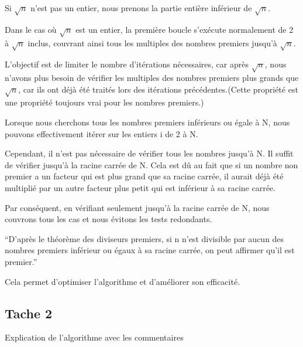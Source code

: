 \documentclass[
    ]{article}
\begin{document}
Si \(\sqrt{n}\) n'est pas un entier, nous prenons la partie entière
inférieur de \(\sqrt{n}\).

Dans le cas où \(\sqrt{n}\) est un entier, la première boucle s'exécute
normalement de 2 à \(\sqrt{n}\) inclus, couvrant ainsi tous les
multiples des nombres premiers jusqu'à \(\sqrt{n}\).

L'objectif est de limiter le nombre d'itérations nécessaires, car après
\(\sqrt{n}\), nous n'avons plus besoin de vérifier les multiples des
nombres premiers plus grands que \(\sqrt{n}\), car ils ont déjà été
traités lors des itérations précédentes.(Cette propriété est une
propriété toujours vrai pour les nombres premiers.)

Lorsque nous cherchons tous les nombres premiers inférieurs ou égale à
N, nous pouvons effectivement itérer sur les entiers i de 2 à N.

Cependant, il n'est pas nécessaire de vérifier tous les nombres jusqu'à
N. Il suffit de vérifier jusqu'à la racine carrée de N. Cela est dû au
fait que si un nombre non premier a un facteur qui est plus grand que sa
racine carrée, il aurait déjà été multiplié par un autre facteur plus
petit qui est inférieur à sa racine carrée.

Par conséquent, en vérifiant seulement jusqu'à la racine carrée de N,
nous couvrons tous les cas et nous évitons les tests redondants.

``D'après le théorème des diviseurs premiers, si n n'est divisible par
aucun des nombres premiers inférieur ou égaux à sa racine carrée, on
peut affirmer qu'il est premier.''

Cela permet d'optimiser l'algorithme et d'améliorer son efficacité.

\pagebreak

\hypertarget{tache-2}{%
\subsection{Tache 2}\label{tache-2}}
Explication de l'algorithme avec les commentaires
\end{document}
